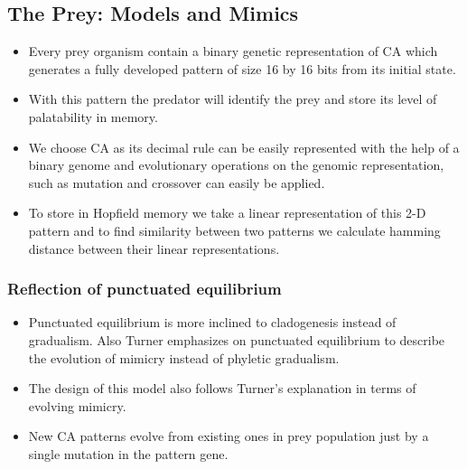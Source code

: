 \documentclass[a0,landscape]{a0poster}
\begin{document}
\begin{multicols}{5}
\color{DarkSlateGray}
\subsection*{The Prey: Models and Mimics}

\begin{itemize}
	\item Every prey organism contain a binary genetic representation of CA which generates a fully developed pattern of size 16 by 16 bits from its initial state.
	\item With this pattern the predator will identify the prey and store its level of palatability in memory. 
	\item We choose CA as its decimal rule can be easily represented with the help of a binary genome and evolutionary operations on the genomic representation, such as mutation and crossover can easily be applied. 
	\item To store in Hopfield memory we take a linear representation of this 2-D pattern and to find similarity between two patterns we calculate hamming distance between their linear representations.
\end{itemize}

\color{SaddleBrown} 
\subsubsection*{Reflection of punctuated equilibrium}
\label{subsubsec:reflection-of-punctuated-equilibrium}

\begin{itemize}
	\item Punctuated equilibrium is more inclined to cladogenesis instead of gradualism. Also Turner \citep{turner1988} emphasizes on punctuated equilibrium to describe the evolution of mimicry instead of phyletic gradualism. 
	\item The design of this model also follows Turner's explanation in terms of evolving mimicry.
	\item New CA patterns evolve from existing ones in prey population just by a single mutation in the pattern gene. 
\end{itemize}


\end{multicols}
\end{document}
